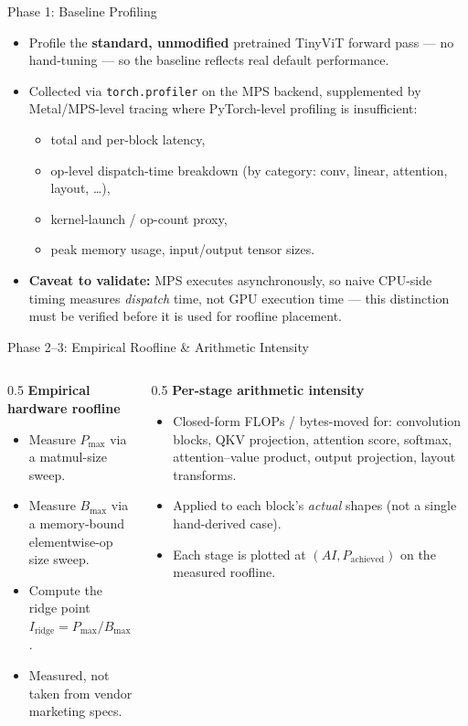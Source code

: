 \documentclass[aspectratio=169]{beamer}
\begin{document}
\begin{frame}{Phase 1: Baseline Profiling}
  \begin{itemize}
    \item Profile the \textbf{standard, unmodified} pretrained TinyViT forward pass --- no
      hand-tuning --- so the baseline reflects real default performance.
    \item Collected via \texttt{torch.profiler} on the MPS backend, supplemented by
      Metal/MPS-level tracing where PyTorch-level profiling is insufficient:
    \begin{itemize}
      \item total and per-block latency,
      \item op-level dispatch-time breakdown (by category: conv, linear, attention, layout, \ldots),
      \item kernel-launch / op-count proxy,
      \item peak memory usage, input/output tensor sizes.
    \end{itemize}
    \item \textbf{Caveat to validate:} MPS executes asynchronously, so naive CPU-side timing
      measures \emph{dispatch} time, not GPU execution time --- this distinction must be verified
      before it is used for roofline placement.
  \end{itemize}
\end{frame}

\begin{frame}{Phase 2--3: Empirical Roofline \& Arithmetic Intensity}
  \begin{columns}[T]
    \begin{column}{0.5\textwidth}
      \textbf{Empirical hardware roofline}
      \begin{itemize}
        \item Measure $P_{\max}$ via a matmul-size sweep.
        \item Measure $B_{\max}$ via a memory-bound
          elementwise-op size sweep.
        \item Compute the ridge point $I_{\text{ridge}} = P_{\max}/B_{\max}$.
        \item Measured, not taken from vendor marketing specs.
      \end{itemize}
    \end{column}
    \begin{column}{0.5\textwidth}
      \textbf{Per-stage arithmetic intensity}
      \begin{itemize}
        \item Closed-form FLOPs / bytes-moved for: convolution blocks, QKV projection, attention
          score, softmax, attention--value product, output projection, layout transforms.
        \item Applied to each block's \emph{actual} shapes (not a single hand-derived case).
        \item Each stage is plotted at $(AI, P_{\text{achieved}})$ on the measured roofline.
      \end{itemize}
    \end{column}
  \end{columns}
\end{frame}
\end{document}
